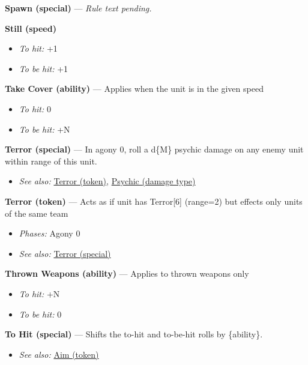\documentclass[a4paper,12pt]{article}
\begin{document}
\label{rule-special-spawn}%
\noindent\textbf{Spawn (special)} --- \textit{Rule text pending.}

\label{rule-speed-still}%
\noindent\textbf{Still (speed)}\begin{itemize}
\item \textit{To hit:} +1
\item \textit{To be hit:} +1
\end{itemize}


\label{rule-ability-take-cover}%
\noindent\textbf{Take Cover (ability)} --- Applies when the unit is in the given speed
\begin{itemize}
\item \textit{To hit:} 0
\item \textit{To be hit:} +N
\end{itemize}


\label{rule-special-terror}%
\noindent\textbf{Terror (special)} --- In agony 0, roll a d\{M\} psychic damage on any enemy unit within range of this unit.
\begin{itemize}
\item \textit{See also:} \hyperref[rule-token-terror]{Terror (token)}, \hyperref[rule-damage-type-psychic]{Psychic (damage type)}
\end{itemize}


\label{rule-token-terror}%
\noindent\textbf{Terror (token)} --- Acts as if unit has Terror[6] (range=2) but effects only units of the same team
\begin{itemize}
\item \textit{Phases:} Agony 0
\item \textit{See also:} \hyperref[rule-special-terror]{Terror (special)}
\end{itemize}


\label{rule-ability-thrown-weapons}%
\noindent\textbf{Thrown Weapons (ability)} --- Applies to thrown weapons only
\begin{itemize}
\item \textit{To hit:} +N
\item \textit{To be hit:} 0
\end{itemize}


\label{rule-special-to-hit}%
\noindent\textbf{To Hit (special)} --- Shifts the to-hit and to-be-hit rolls by \{ability\}.
\begin{itemize}
\item \textit{See also:} \hyperref[rule-token-aim]{Aim (token)}
\end{itemize}
\end{document}

